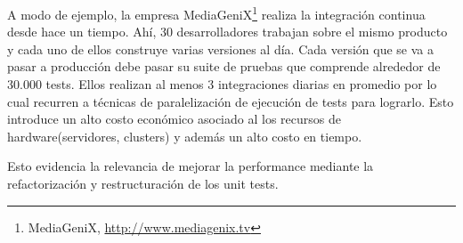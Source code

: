 \par A modo de ejemplo, la empresa MediaGeniX\footnote{MediaGeniX, \url{http://www.mediagenix.tv}} realiza la integración continua desde hace un tiempo. Ahí, 30 desarrolladores trabajan sobre el mismo producto y cada uno de ellos construye varias versiones al día. Cada versión que se va a pasar a producción debe pasar su suite de pruebas que comprende alrededor de 30.000 tests. Ellos realizan al menos 3 integraciones diarias en promedio por lo cual recurren a técnicas de paralelización de ejecución de tests para lograrlo. Esto introduce un alto costo económico asociado al los recursos de hardware(servidores, clusters) y además un alto costo en tiempo.\\

\par Esto evidencia la relevancia de mejorar la performance mediante la refactorización y restructuración de los unit tests.
